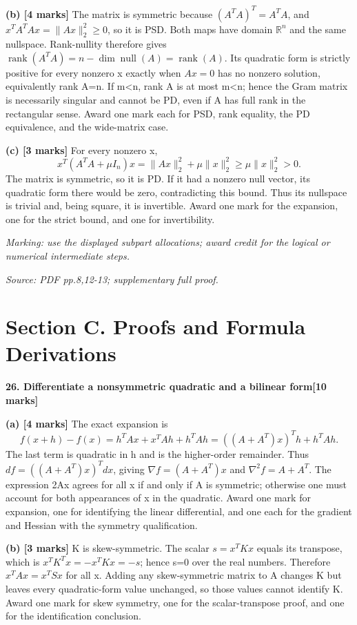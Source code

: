 \documentclass[11pt,a4paper]{article}
\begin{document}
\textbf{(b) [4 marks]} The matrix is symmetric because \((A^TA)^T=A^TA\), and \(x^TA^TAx=\|Ax\|_2^2\geq0\), so it is PSD. Both maps have domain \(\mathbb R^n\) and the same nullspace. Rank-nullity therefore gives \(\operatorname{rank}(A^TA)=n-\dim\operatorname{null}(A)=\operatorname{rank}(A)\). Its quadratic form is strictly positive for every nonzero x exactly when \(Ax=0\) has no nonzero solution, equivalently rank A=n. If m<n, rank A is at most m<n; hence the Gram matrix is necessarily singular and cannot be PD, even if A has full rank in the rectangular sense. Award one mark each for PSD, rank equality, the PD equivalence, and the wide-matrix case.

\textbf{(c) [3 marks]} For every nonzero x, \[x^T(A^TA+\mu I_n)x=\|Ax\|_2^2+\mu\|x\|_2^2\geq\mu\|x\|_2^2>0.\] The matrix is symmetric, so it is PD. If it had a nonzero null vector, its quadratic form there would be zero, contradicting this bound. Thus its nullspace is trivial and, being square, it is invertible. Award one mark for the expansion, one for the strict bound, and one for invertibility.

\textit{Marking: use the displayed subpart allocations; award credit for the logical or numerical intermediate steps.}\par
{\footnotesize\textit{Source: PDF pp.8,12-13; supplementary full proof.}}
\newpage\section*{Section C. Proofs and Formula Derivations}
\textbf{26. Differentiate a nonsymmetric quadratic and a bilinear form}\hfill\textbf{[10 marks]}\par\medskip
\textbf{(a) [4 marks]} The exact expansion is \[f(x+h)-f(x)=h^TAx+x^TAh+h^TAh=((A+A^T)x)^Th+h^TAh.\] The last term is quadratic in h and is the higher-order remainder. Thus \(df=((A+A^T)x)^Tdx\), giving \(\nabla f=(A+A^T)x\) and \(\nabla^2 f=A+A^T\). The expression 2Ax agrees for all x if and only if A is symmetric; otherwise one must account for both appearances of x in the quadratic. Award one mark for expansion, one for identifying the linear differential, and one each for the gradient and Hessian with the symmetry qualification.

\textbf{(b) [3 marks]} K is skew-symmetric. The scalar \(s=x^TKx\) equals its transpose, which is \(x^TK^Tx=-x^TKx=-s\); hence s=0 over the real numbers. Therefore \(x^TAx=x^TSx\) for all x. Adding any skew-symmetric matrix to A changes K but leaves every quadratic-form value unchanged, so those values cannot identify K. Award one mark for skew symmetry, one for the scalar-transpose proof, and one for the identification conclusion.
\end{document}
